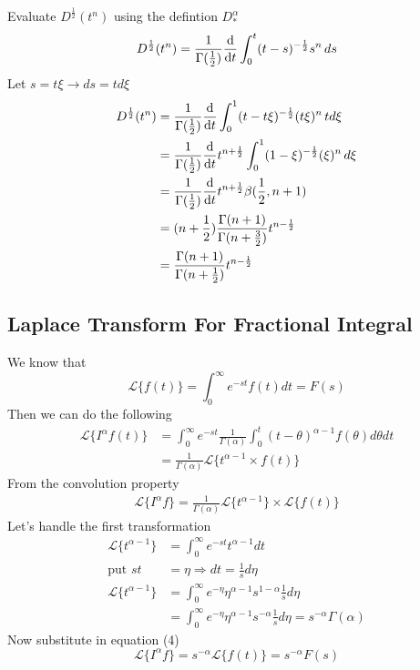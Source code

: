 \begin{example}
    Evaluate $D^{\frac{1}{2}}(t^n)$ using the defintion $D_{*}^{\alpha}$
    \[
        D^{\frac{1}{2}}(t^n) = \frac{1}{\Gamma{(\frac{1}{2})}} \dv{}{t} \int_0^t (t-s)^{-\frac{1}{2}} s^n \, ds
    \]
    Let $s = t\xi \rightarrow ds=td\xi$
    \begin{align*}
        D^{\frac{1}{2}}(t^n) & = \frac{1}{\Gamma{(\frac{1}{2})}} \dv{}{t} \int_0^1 (t-t\xi)^{-\frac{1}{2}} (t\xi)^n \, td\xi                 \\
                             & = \frac{1}{\Gamma{(\frac{1}{2})}}  \dv{}{t} t^{n+\frac{1}{2}} \int_0^1 (1-\xi)^{-\frac{1}{2}} (\xi)^n \, d\xi \\
                             & = \frac{1}{\Gamma{(\frac{1}{2})}}  \dv{}{t} t^{n+\frac{1}{2}} \beta{(\frac{1}{2}, n+1)}                       \\
                             & = (n+\frac{1}{2}) \frac{\Gamma{(n+1)}}{\Gamma{(n+\frac{3}{2})}}      t^{n-\frac{1}{2}}                        \\
                             & = \frac{\Gamma{(n+1)}}{\Gamma{(n+\frac{1}{2})}}  t^{n-\frac{1}{2}}                                            \\
    \end{align*}
\end{example}
\newpage
\subsection{Laplace Transform For Fractional Integral}
We know that
\[
    \mathcal{L} \{f(t)\} = \int_{0}^{\infty}e^{-st}f(t)dt = F(s)
\]
Then we can do the following
\begin{align*}
    \mathcal{L}\{I^{\alpha}f(t)\} & = \int_{0}^{\infty}e^{-st}\frac{1}{\Gamma(\alpha)}\int_{0}^{t}(t-\theta)^{\alpha-1}f(\theta)d\theta dt
    \\
                                  & = \frac{1}{\Gamma(\alpha)} \mathcal{L}\{t^{\alpha-1}\times f(t)\}
\end{align*}
From the convolution property
\begin{align}
    \mathcal{L}\{I^{\alpha}f\} = \frac{1}{\Gamma(\alpha)} \mathcal{L}\{t^{\alpha-1}\}\times \mathcal{L}\{f(t)\}
\end{align}
Let's handle the first transformation
\begin{align*}
    \mathcal{L}\{t^{\alpha-1}\} & = \int_{0}^{\infty}e^{-st}t^{\alpha-1}dt
    \\
    \text{put } st              & = \eta \Longrightarrow dt = \frac{1}{s}d\eta
    \\
    \mathcal{L}\{t^{\alpha-1}\} & = \int_{0}^{\infty}e^{-\eta}\eta^{\alpha-1}s^{1-\alpha}\frac{1}{s}d\eta
    \\
                                & = \int_{0}^{\infty}e^{-\eta}\eta^{\alpha-1}s^{-\alpha}\frac{1}{s}d\eta = s^{-\alpha}\Gamma(\alpha)
\end{align*}
Now substitute in equation (4)
\[
    \mathcal{L}\{I^{\alpha}f\} = s^{-\alpha}\mathcal{L}\{f(t)\} = s^{-\alpha} F(s)
\]
